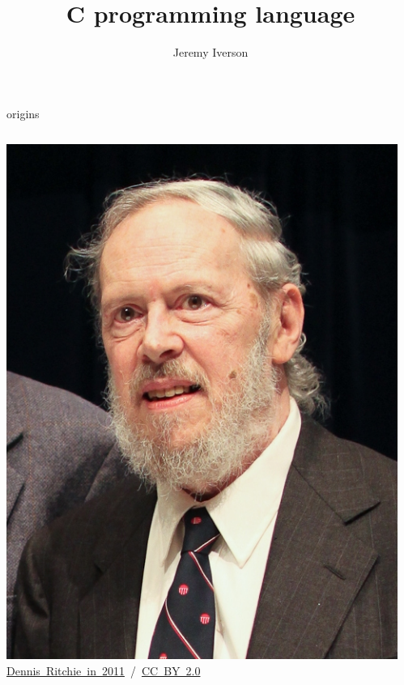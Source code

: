 \documentclass[10pt,t]{beamer}
\title{C programming language}
\date{}
\author{Jeremy Iverson}
\institute{College of Saint Benedict \& Saint John's University}
\begin{document}
  \maketitle

  \begin{frame}{origins}
    \vspace{3ex}
    \begin{columns}
      \begin{column}{.38425\textwidth}
        \includegraphics[width=\textwidth]{Dennis_Ritchie_2011.jpg}\\
        \hfill \tiny{\href{https://en.wikipedia.org/wiki/Dennis\_Ritchie\#/media/File:Dennis\_Ritchie\_2011.jpg}{Dennis~Ritchie~in~2011}~/~\href{http://creativecommons.org/licenses/by-sa/2.0}{CC~BY~2.0}}
      \end{column}
      \begin{column}{.51575\textwidth}

\end{column}
\end{columns}
\end{frame}
\end{document}
